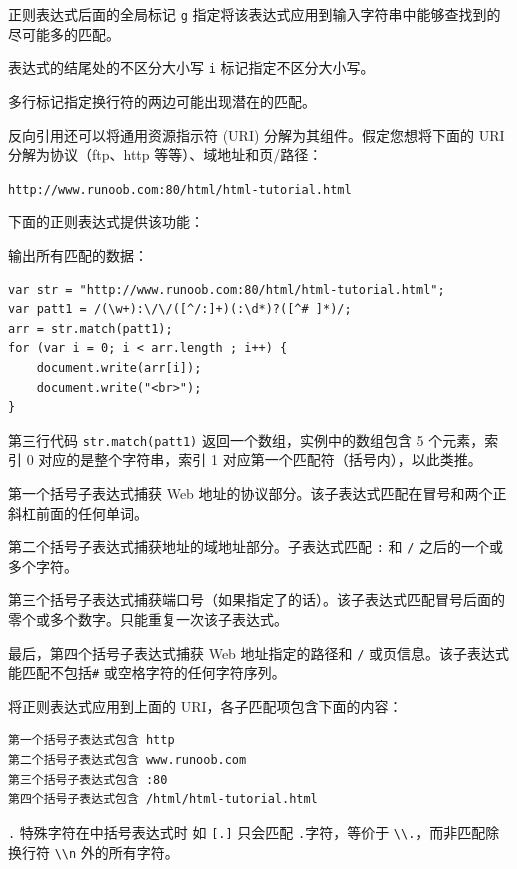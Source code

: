 \documentclass[doctor,openright,twoside]{sjtuthesis}
\newcommand{\passthrough}[1]{#1}
\theoremstyle{plain}
\theoremstyle{definition}
\theoremstyle{remark}
\theoremstyle{ocrenumbox}
\theoremstyle{plain}
\begin{document}
正则表达式后面的全局标记 \passthrough{\lstinline!g!}
指定将该表达式应用到输入字符串中能够查找到的尽可能多的匹配。

表达式的结尾处的不区分大小写 \passthrough{\lstinline!i!}
标记指定不区分大小写。

多行标记指定换行符的两边可能出现潜在的匹配。

反向引用还可以将通用资源指示符 (URI) 分解为其组件。假定您想将下面的 URI
分解为协议（ftp、http 等等）、域地址和页/路径：

\passthrough{\lstinline!http://www.runoob.com:80/html/html-tutorial.html!}

下面的正则表达式提供该功能：

输出所有匹配的数据：

\begin{lstlisting}
var str = "http://www.runoob.com:80/html/html-tutorial.html";
var patt1 = /(\w+):\/\/([^/:]+)(:\d*)?([^# ]*)/;
arr = str.match(patt1);
for (var i = 0; i < arr.length ; i++) {
    document.write(arr[i]);
    document.write("<br>");
}
\end{lstlisting}

第三行代码 \passthrough{\lstinline!str.match(patt1)!}
返回一个数组，实例中的数组包含 5 个元素，索引 0 对应的是整个字符串，索引
1 对应第一个匹配符（括号内），以此类推。

第一个括号子表达式捕获 Web
地址的协议部分。该子表达式匹配在冒号和两个正斜杠前面的任何单词。

第二个括号子表达式捕获地址的域地址部分。子表达式匹配
\passthrough{\lstinline!:!} 和 \passthrough{\lstinline!/!}
之后的一个或多个字符。

第三个括号子表达式捕获端口号（如果指定了的话）。该子表达式匹配冒号后面的零个或多个数字。只能重复一次该子表达式。

最后，第四个括号子表达式捕获 Web 地址指定的路径和
\passthrough{\lstinline!/!}
或页信息。该子表达式能匹配不包括\passthrough{\lstinline!#!}
或空格字符的任何字符序列。

将正则表达式应用到上面的 URI，各子匹配项包含下面的内容：

\begin{lstlisting}
第一个括号子表达式包含 http
第二个括号子表达式包含 www.runoob.com
第三个括号子表达式包含 :80
第四个括号子表达式包含 /html/html-tutorial.html
\end{lstlisting}

\passthrough{\lstinline!.!} 特殊字符在中括号表达式时 如
\passthrough{\lstinline![.]!} 只会匹配
\passthrough{\lstinline!.!}字符，等价于
\passthrough{\lstinline!\\.!}，而非匹配除换行符
\passthrough{\lstinline!\\n!} 外的所有字符。
\end{document}
